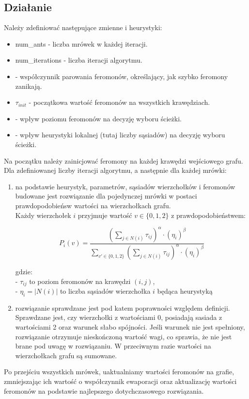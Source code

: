 \subsection{Działanie}
Należy zdefiniować następujące zmienne i heurystyki:
\begin{itemize}
    \item num\_ants - liczba mrówek w każdej iteracji.
    \item num\_iterations - liczba iteracji algorytmu.
    \item \textbf{\rho} - współczynnik parowania feromonów, określający, jak szybko feromony zanikają.
    \item $\tau_{init}$ - początkowa wartość feromonów na wszystkich krawędziach.
    \item \textbf{\alpha} - wpływ poziomu feromonów na decyzję wyboru ścieżki.
    \item \textbf{\beta} - wpływ heurystyki lokalnej (tutaj liczby sąsiadów) na decyzję wyboru ścieżki.
\end{itemize}
Na początku należy zainicjować feromony na każdej krawędzi wejściowego grafu.\\
Dla zdefiniowanej liczby iteracji algorytmu, a następnie dla każdej mrówki:
\begin{enumerate}
    \item na podstawie heurystyk, parametrów, sąsiadów wierzchołków i feromonów budowane jest rozwiązanie dla pojedynczej mrówki w postaci prawdopodobieńsw wartości na wierzchołkach grafu.\\
    Każdy wierzchołek \( i \) przyjmuje wartość \( v \in \{0,1,2\} \) z prawdopodobieństwem:

\[
P_i(v) = \frac{ \left( \sum\limits_{j \in N(i)} \tau_{ij} \right)^\alpha \cdot (\eta_i)^\beta }
{\sum\limits_{v' \in \{0,1,2\}} \left( \sum\limits_{j \in N(i)} \tau_{ij} \right)^\alpha \cdot (\eta_i)^\beta}
\]

gdzie:\\
- \( \tau_{ij} \) to poziom feromonów na krawędzi \( (i,j) \),\\
- \( \eta_i = |N(i)| \) to liczba sąsiadów wierzchołka \( i \) będąca heurystyką

    \item rozwiązanie sprawdzane jest pod katem poprawności względem definicji. Sprawdzane jest, czy wierzchołki z wartościami 0, posiadają sasiada z wartościami 2 oraz warunek słabo spójności. Jeśli warunek nie jest spełniony, rozwiązanie otrzymuje nieskończoną wartość wagi, co sprawia, że nie jest brane pod uwagę w rozwiązaniu. W przeciwnym razie wartości na wierzchołkach grafu są sumowane.
\end{enumerate}
Po przejściu wszystkich mrówek, uaktualniamy wartości feromonów na grafie, zmniejszając ich wartość o współczynnik ewaporacji oraz aktualizację wartości feromonów na podstawie najlepszego dotychczasowego rozwiązania.

